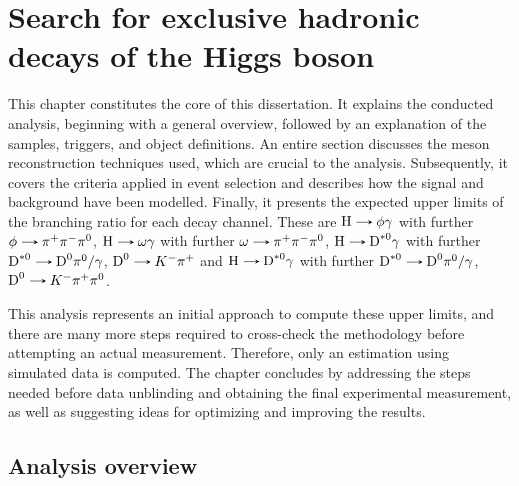 \chapter[Search for exclusive hadronic decays of the Higgs boson]{Search for exclusive hadronic decays of the Higgs boson}\label{chap:analysis}

This chapter constitutes the core of this dissertation. It explains the conducted analysis, beginning with a general overview, followed by an explanation of the samples, triggers, and object definitions. An entire section discusses the meson reconstruction techniques used, which are crucial to the analysis. Subsequently, it covers the criteria applied in event selection and describes how the signal and background have been modelled. Finally, it presents the expected upper limits of the branching ratio for each decay channel. These are $\text{H}\decaysto \phi\gamma$ with further $\phi\decaysto \pi^+\pi^-\pi^0$, $\text{H}\decaysto \omega\gamma$ with further $\omega\decaysto \pi^+\pi^-\pi^0$, $\text{H}\decaysto \text{D}^{*0}\gamma$ with further $\text{D}^{*0}\decaysto \text{D}^{0}\pi^{0}/\gamma$, $\text{D}^{0}\decaysto K^{-}\pi^{+}$ and $\text{H}\decaysto \text{D}^{*0}\gamma$ with further $\text{D}^{*0}\decaysto \text{D}^{0}\pi^{0}/\gamma$, $\text{D}^{0}\decaysto K^{-}\pi^{+}\pi^{0}$.

This analysis represents an initial approach to compute these upper limits, and there are many more steps required to cross-check the methodology before attempting an actual measurement. Therefore, only an estimation using simulated data is computed. The chapter concludes by addressing the steps needed before data unblinding and obtaining the final experimental measurement, as well as suggesting ideas for optimizing and improving the results.

\section{Analysis overview}\label{sec:analysis_overview}

